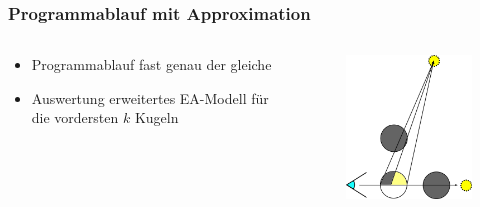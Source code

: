 \documentclass[xcolor=dvipsnames]{beamer}
\begin{document}
{
	\begin{frame}[plain]
	\end{frame}
}

\begin{frame}
	\frametitle{Programmablauf mit Approximation}
	\begin{columns}
		\begin{column}{5cm}
			\begin{itemize}
				\item Programmablauf fast genau der gleiche
				\item Auswertung erweitertes EA-Modell für die vordersten $k$ Kugeln
			\end{itemize}
		\end{column}
		\begin{column}{8cm}
			\begin{figure}
				\includegraphics[width=6cm]{images/ablaufApprox.png}
			\end{figure}
		\end{column}
	\end{columns}
	
\end{frame}
\end{document}
